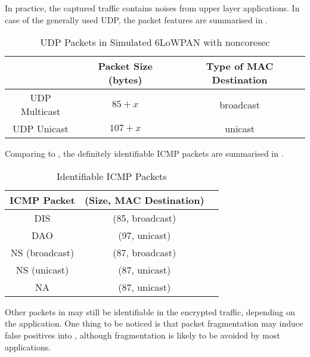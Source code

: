 In practice, the captured traffic contains noises from upper layer applications. In case of the generally used UDP\cite{rfc768}, the packet features are summarised in .

\begin{table}[ht!]
	\center
	{
		\begin{tabular}{|c|c|c|}
			\hline
			       & Packet Size (bytes) & Type of MAC Destination \\ \hline
			UDP Multicast   & $85+x$                  & broadcast                       \\ \hline
			UDP Unicast   & $107+x$                  & unicast                       \\ \hline
		\end{tabular}
	}
	\caption{UDP Packets in Simulated 6LoWPAN with noncoresec}
	\label{UDPPacketFeature}
\end{table}

Comparing  to , the definitely identifiable ICMP packets are summarised in .

\begin{table}[ht!]
	\center
	{
		\begin{tabular}{|c|c|c|}
			\hline
			ICMP Packet & (Size, MAC Destination)\\ \hline
			DIS   & (85, broadcast)                       \\ \hline
			DAO   & (97, unicast)                       \\ \hline
			NS (broadcast)   & (87, broadcast)                       \\ \hline	
			NS (unicast)   & (87, unicast)                       \\ \hline
			NA 	& (87, unicast)                       \\ \hline
		\end{tabular}
	}
	\caption{Identifiable ICMP Packets}
	\label{TAICMP}
\end{table}

Other packets in  may still be identifiable in the encrypted traffic, depending on the application. One thing to be noticed is that packet fragmentation may induce false positives into , although fragmentation is likely to be avoided by most applications.

